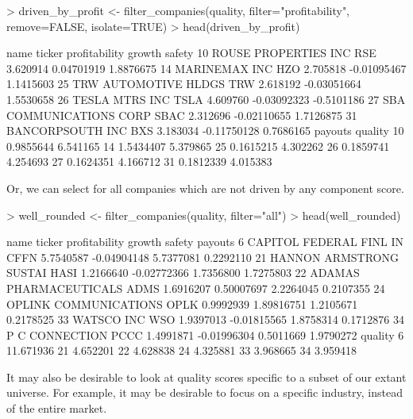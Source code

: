 \documentclass[titlepage]{article}
\begin{document}
\begin{Schunk}
\begin{Sinput}
> driven_by_profit <- filter_companies(quality, filter="profitability", remove=FALSE, isolate=TRUE)
> head(driven_by_profit)
\end{Sinput}
\begin{Soutput}
                      name ticker profitability      growth     safety
10    ROUSE PROPERTIES INC    RSE      3.620914  0.04701919  1.8876675
14           MARINEMAX INC    HZO      2.705818 -0.01095467  1.1415603
25    TRW AUTOMOTIVE HLDGS    TRW      2.618192 -0.03051664  1.5530658
26          TESLA MTRS INC   TSLA      4.609760 -0.03092323 -0.5101186
27 SBA COMMUNICATIONS CORP   SBAC      2.312696 -0.02110655  1.7126875
31        BANCORPSOUTH INC    BXS      3.183034 -0.11750128  0.7686165
     payouts  quality
10 0.9855644 6.541165
14 1.5434407 5.379865
25 0.1615215 4.302262
26 0.1859741 4.254693
27 0.1624351 4.166712
31 0.1812339 4.015383
\end{Soutput}
\end{Schunk}

Or, we can select for all companies which are not driven by any component score.

\begin{Schunk}
\begin{Sinput}
> well_rounded <- filter_companies(quality, filter="all")
> head(well_rounded)
\end{Sinput}
\begin{Soutput}
                      name ticker profitability      growth    safety   payouts
6  CAPITOL FEDERAL FINL IN   CFFN     5.7540587 -0.04904148 5.7377081 0.2292110
21 HANNON ARMSTRONG SUSTAI   HASI     1.2166640 -0.02772366 1.7356800 1.7275803
22  ADAMAS PHARMACEUTICALS   ADMS     1.6916207  0.50007697 2.2264045 0.2107355
24   OPLINK COMMUNICATIONS   OPLK     0.9992939  1.89816751 1.2105671 0.2178525
33              WATSCO INC    WSO     1.9397013 -0.01815565 1.8758314 0.1712876
34          P C CONNECTION   PCCC     1.4991871 -0.01996304 0.5011669 1.9790272
     quality
6  11.671936
21  4.652201
22  4.628838
24  4.325881
33  3.968665
34  3.959418
\end{Soutput}
\end{Schunk}

It may also be desirable to look at quality scores specific to a subset of our extant universe. For example, it may be desirable to focus on a specific industry, instead of the entire market.
\end{document}
